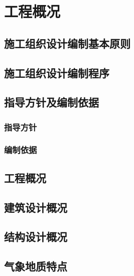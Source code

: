 \section{工程概况}
\subsection{施工组织设计编制基本原则}
\subsection{施工组织设计编制程序}
\subsection{指导方针及编制依据}
\subsubsection{指导方针}
\subsubsection{编制依据}
\subsection{工程概况}
\subsection{建筑设计概况}
\subsection{结构设计概况}
\subsection{气象地质特点}

